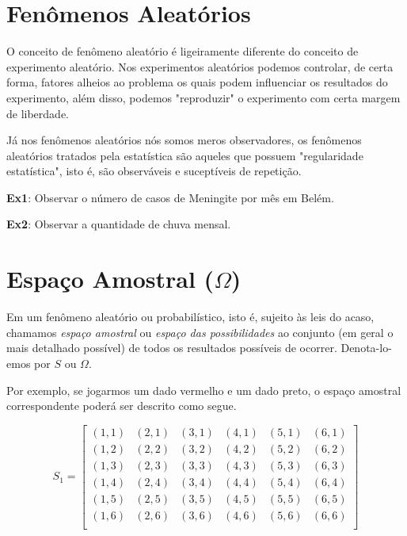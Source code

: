 \section{Fenômenos Aleatórios}

O conceito de fenômeno aleatório é ligeiramente diferente do
conceito de experimento aleatório. Nos experimentos aleatórios
podemos controlar, de certa forma, fatores alheios ao problema os
quais podem influenciar os resultados do experimento, além disso,
podemos "reproduzir" o experimento com certa margem de
liberdade.\vskip0.3cm

Já nos fenômenos aleatórios nós somos meros observadores, os
fenômenos aleatórios tratados pela estatística são aqueles que
possuem "regularidade estatística", isto é, são observáveis e
suceptíveis de repetição.\vskip0.3cm

\textbf{Ex1}: Observar o número de casos de Meningite por mês em
Belém. \vskip0.3cm

\textbf{Ex2}: Observar a quantidade de chuva mensal.\vskip0.3cm



\section{Espaço Amostral ($\Omega$)}

Em um fenômeno aleatório ou probabilístico, isto é, sujeito às
leis do acaso, chamamos \emph{espaço amostral} ou \emph{espaço das
possibilidades} ao conjunto (em geral o mais detalhado possível)
de todos os resultados possíveis de ocorrer. Denota-lo-emos por
$S$ ou $\Omega$.\vskip0.3cm

Por exemplo, se jogarmos um dado vermelho e um dado preto, o
espaço amostral correspondente poderá ser descrito como segue.

$$
S_{1} =
\left[%
\begin{array}{cccccc}
  (1,1) & (2,1) & (3,1) & (4,1) & (5,1) & (6,1) \\
  (1,2) & (2,2) & (3,2) & (4,2) & (5,2) & (6,2) \\
  (1,3) & (2,3) & (3,3) & (4,3) & (5,3) & (6,3) \\
  (1,4) & (2,4) & (3,4) & (4,4) & (5,4) & (6,4) \\
  (1,5) & (2,5) & (3,5) & (4,5) & (5,5) & (6,5) \\
  (1,6) & (2,6) & (3,6) & (4,6) & (5,6) & (6,6) \\
\end{array}%
\right]
$$

